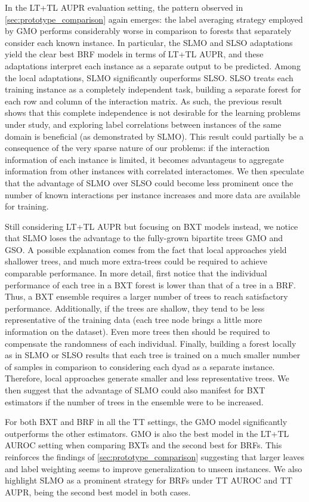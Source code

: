 In the LT+TL AUPR evaluation setting, the pattern observed in \autoref{sec:prototype_comparison} again emerges: the label averaging strategy employed by GMO performs considerably worse in comparison to forests that separately consider each known instance. In particular, the SLMO and SLSO adaptations yield the clear best BRF models in terms of LT+TL AUPR, and these adaptations interpret each instance as a separate output to be predicted. Among the local adaptations, SLMO significantly ouperforms SLSO. SLSO treats each training instance as a completely independent task, building a separate forest for each row and column of the interaction matrix. As such, the previous result shows that this complete independence is not desirable for the learning problems under study, and exploring label correlations between instances of the same domain is beneficial (as demonstrated by SLMO). This result could partially be a consequence of the very sparse nature of our problems: if the interaction information of each instance is limited, it becomes advantageus to aggregate information from other instances with correlated interactomes. We then speculate that the advantage of SLMO over SLSO could become less prominent once the number of known interactions per instance increases and more data are available for training.

Still considering LT+TL AUPR but focusing on BXT models instead, we notice that SLMO loses the advantage to the fully-grown bipartite trees GMO and GSO. A possible explanation comes from the fact that local approaches yield shallower trees, and much more extra-trees could be required to achieve comparable performance. In more detail, first notice that the individual performance of each tree in a BXT forest is lower than that of a tree in a BRF. Thus, a BXT ensemble requires a larger number of trees to reach satisfactory performance. Additionally, if the trees are shallow, they tend to be less representative of the training data (each tree node brings a little more information on the dataset).
Even more trees then should be required to compensate the randomness of each individual. Finally, building a forest locally as in SLMO or SLSO results that each tree is trained on a much smaller number of samples in comparison to considering each dyad as a separate instance. Therefore, local approaches generate smaller and less representative trees. We then suggest that the advantage of SLMO could also manifest for BXT estimators if the number of trees in the ensemble were to be increased.

For both BXT and BRF in all the TT settings, the GMO model significantly outperforms the other estimators. GMO is also the best model in the LT+TL AUROC setting when comparing BXTs and the second best for BRFs. This reinforces the findings of \autoref{sec:prototype_comparison} suggesting that larger leaves and label weighting seems to improve generalization to unseen instances.
%
We also highlight SLMO as a prominent strategy for BRFs under TT AUROC and TT AUPR, being the second best model in both cases.

